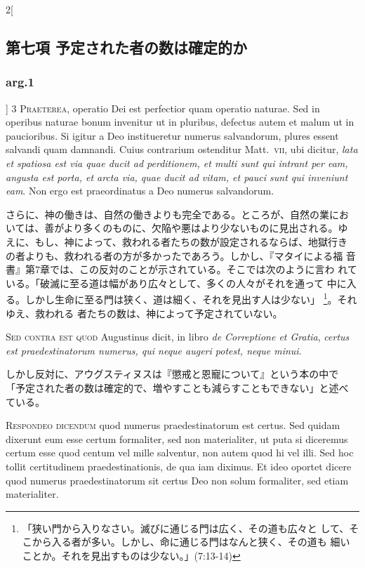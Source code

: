 \documentclass[paper=a4paper,fontsize=10pt,jafontsize=9pt,titlepage]{jlreq}
\begin{document}
\begin{paracol}{2}[\subsection{第七項 予定された者の数は確定的か}\subsubsection{arg.1}]
{\scshape 3 Praeterea}, operatio Dei est perfectior quam
operatio naturae. Sed in operibus naturae bonum invenitur ut in
pluribus, defectus autem et malum ut in paucioribus. Si igitur a Deo
institueretur numerus salvandorum, plures essent salvandi quam
damnandi. Cuius contrarium ostenditur Matt.~{\scshape vii}, ubi dicitur, {\itshape lata et
spatiosa est via quae ducit ad perditionem, et multi sunt qui intrant
per eam, angusta est porta, et arcta via, quae ducit ad vitam, et pauci
sunt qui inveniunt eam}. Non ergo est praeordinatus a Deo numerus
salvandorum.


\switchcolumn


さらに、神の働きは、自然の働きよりも完全である。ところが、自然の業にお
いては、善がより多くのものに、欠陥や悪はより少ないものに見出される。ゆ
えに、もし、神によって、救われる者たちの数が設定されるならば、地獄行き
の者よりも、救われる者の方が多かったであろう。しかし、『マタイによる福
音書』第7章では、この反対のことが示されている。そこでは次のように言わ
れている。「破滅に至る道は幅があり広々として、多くの人々がそれを通って
中に入る。しかし生命に至る門は狭く、道は細く、それを見出す人は少ない」
\footnote{「狭い門から入りなさい。滅びに通じる門は広く、その道も広々と
して、そこから入る者が多い。しかし、命に通じる門はなんと狭く、その道も
細いことか。それを見出すものは少ない。」(7:13-14)}。それゆえ、救われる
者たちの数は、神によって予定されていない。


\switchcolumn*[\subsubsection{s.c.}]


{\scshape Sed contra est quod} Augustinus dicit, in
libro {\itshape de Correptione et Gratia}, {\itshape certus est praedestinatorum numerus, qui
neque augeri potest, neque minui}.


\switchcolumn


しかし反対に、アウグスティヌスは『懲戒と恩寵について』という本の中で
「予定された者の数は確定的で、増やすことも減らすこともできない」と述べ
ている。




{\scshape Respondeo dicendum} quod numerus
praedestinatorum est certus. Sed quidam dixerunt eum esse certum
formaliter, sed non materialiter, ut puta si diceremus certum esse quod
centum vel mille salventur, non autem quod hi vel illi. Sed hoc tollit
certitudinem praedestinationis, de qua iam diximus. Et ideo oportet
dicere quod numerus praedestinatorum sit certus Deo non solum
formaliter, sed etiam materialiter.



\end{paracol}
\end{document}
